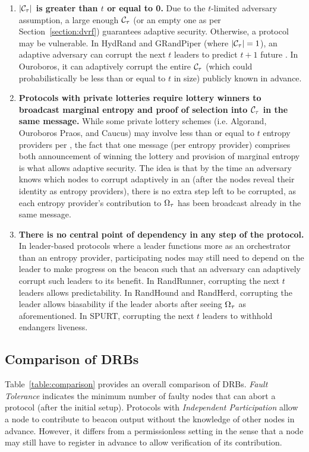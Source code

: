 \begin{enumerate}
\item \textbf{$|\mathcal{C}_\tau|$ is greater than $t$ or equal to 0.} Due to the $t$-limited adversary assumption, a large enough $\mathcal{C}_\tau$ (or an empty one as per Section~\ref{section:dvrf}) guarantees adaptive security. Otherwise, a protocol may be vulnerable. In HydRand and GRandPiper (where $|\mathcal{C}_\tau| = 1$), an adaptive adversary can corrupt the next $t$ \epoch leaders to predict $t + 1$ future \epochs. In Ouroboros, it can adaptively corrupt the entire $\mathcal{C}_\tau$ (which could probabilistically be less than or equal to $t$ in size) publicly known in advance.
\item \textbf{Protocols with private lotteries require lottery winners to broadcast marginal entropy and proof of selection into $\mathcal{C}_\tau$ in the same message.} While some private lottery schemes (i.e. Algorand, Ouroboros Praos, and Caucus) may involve less than or equal to $t$ entropy providers per \epoch, the fact that one message (per entropy provider) comprises both announcement of winning the lottery and provision of marginal entropy is what allows adaptive security. The idea is that by the time an adversary knows which nodes to corrupt adaptively in an \epoch (after the nodes reveal their identity as entropy providers), there is no extra step left to be corrupted, as each entropy provider's contribution to $\Omega_\tau$ has been broadcast already in the same message.
\item \textbf{There is no central point of dependency in any step of the protocol.} In leader-based protocols where a leader functions more as an orchestrator than an entropy provider, participating nodes may still need to depend on the leader to make progress on the beacon such that an adversary can adaptively corrupt such leaders to its benefit. In RandRunner, corrupting the next $t$ leaders allows predictability. In RandHound and RandHerd, corrupting the \epoch leader allows biasability if the leader aborts after seeing $\Omega_\tau$ as aforementioned. In SPURT, corrupting the next $t$ leaders to withhold endangers liveness.
\end{enumerate}

\subsection{Comparison of DRBs}
Table~\ref{table:comparison} provides an overall comparison of DRBs. \textit{Fault Tolerance} indicates the minimum number of faulty nodes that can abort a protocol (after the initial setup). Protocols with \textit{Independent Participation} allow a node to contribute to beacon output without the knowledge of other nodes in advance. However, it differs from a permissionless setting in the sense that a node may still have to register in advance to allow verification of its contribution.

